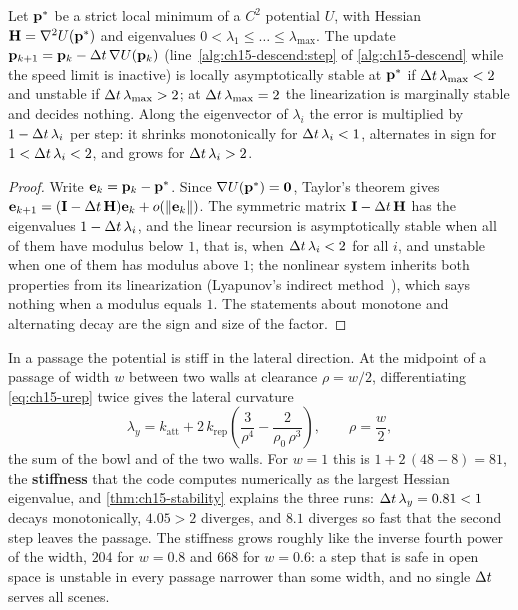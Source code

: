 \begin{proposition}
\label{thm:ch15-stability}
Let $\mathbf{p}^*$ be a strict local minimum of a $C^2$ potential $U$, with Hessian
$\mathbf{H} = \nabla^2 U(\mathbf{p}^*)$ and eigenvalues $0 < \lambda_1 \le \dots \le
\lambda_{\max}$. The update $\mathbf{p}_{k+1} = \mathbf{p}_k - \Delta t\, \nabla U(\mathbf{p}_k)$
(line~\ref{alg:ch15-descend:step} of \cref{alg:ch15-descend} while the speed
limit is inactive) is locally asymptotically stable at $\mathbf{p}^*$ if
$\Delta t\, \lambda_{\max} < 2$ and unstable if $\Delta t\, \lambda_{\max} > 2$; at
$\Delta t\, \lambda_{\max} = 2$ the linearization is marginally stable and decides
nothing. Along the eigenvector of $\lambda_i$ the error
is multiplied by $1 - \Delta t\,\lambda_i$ per step: it shrinks monotonically for
$\Delta t\,\lambda_i < 1$, alternates in sign for $1 < \Delta t\,\lambda_i < 2$, and
grows for $\Delta t\,\lambda_i > 2$.
\end{proposition}
\begin{proof}
Write $\mathbf{e}_k = \mathbf{p}_k - \mathbf{p}^*$. Since $\nabla U(\mathbf{p}^*) = \mathbf{0}$,
Taylor's theorem gives $\mathbf{e}_{k+1} = (\mathbf{I} - \Delta t\,\mathbf{H})\mathbf{e}_k +
o(\left\lVert \mathbf{e}_k \right\rVert)$. The symmetric matrix $\mathbf{I} - \Delta t\,\mathbf{H}$ has the
eigenvalues $1 - \Delta t\,\lambda_i$, and the linear recursion is
asymptotically stable when all of them have modulus below $1$, that is, when
$\Delta t\,\lambda_i < 2$ for all $i$, and unstable when one of them has modulus
above $1$; the nonlinear system inherits both properties from its
linearization (Lyapunov's indirect method~\cite{khalil2002nonlinear}), which says nothing
when a modulus equals $1$. The statements about
monotone and alternating decay are the sign and size of the factor.
\end{proof}

In a passage the potential is stiff in the lateral direction. At the
midpoint of a passage of width $w$ between two walls at clearance $\rho =
w/2$, differentiating \cref{eq:ch15-urep} twice gives the lateral curvature
\begin{equation}
  \lambda_y = k_{\mathrm{att}} + 2\, k_{\mathrm{rep}} \left( \frac{3}{\rho^4} - \frac{2}{\rho_0\, \rho^3} \right),
  \qquad \rho = \frac{w}{2},
  \label{eq:ch15-stiffness}
\end{equation}
the sum of the bowl and of the two walls. For $w = 1$ this is $1 + 2\,(48 -
8) = 81$, the \textbf{stiffness} that the code
computes numerically as the largest Hessian eigenvalue, and
\cref{thm:ch15-stability} explains the three runs: $\Delta t\,\lambda_y = 0.81 <
1$ decays monotonically, $4.05 > 2$ diverges, and $8.1$ diverges so fast that
the second step leaves the passage. The stiffness grows roughly like the
inverse fourth power of the width, $204$ for $w = 0.8$ and $668$ for $w =
0.6$: a step that is safe in open space is unstable in every passage
narrower than some width, and no single $\Delta t$ serves all scenes.

